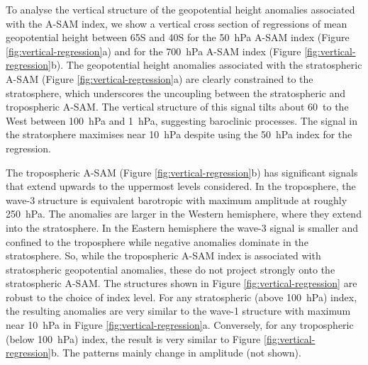 \documentclass[smallextended]{svjour3}       %
\begin{document}
To analyse the vertical structure of the geopotential height anomalies associated with the A\nobreakdash-SAM index, we show a vertical cross section of regressions of mean geopotential height between 65\degree S and 40\degree S for the 50~hPa A\nobreakdash-SAM index (Figure \ref{fig:vertical-regression}a) and for the 700~hPa A\nobreakdash-SAM index (Figure \ref{fig:vertical-regression}b).
The geopotential height anomalies associated with the stratospheric A\nobreakdash-SAM (Figure \ref{fig:vertical-regression}a) are clearly constrained to the stratosphere, which underscores the uncoupling between the stratospheric and tropospheric A\nobreakdash-SAM.
The vertical structure of this signal tilts about 60\degree~to the West between 100~hPa and 1~hPa, suggesting baroclinic processes.
The signal in the stratosphere maximises near 10~hPa despite using the 50~hPa index for the regression.

The tropospheric A\nobreakdash-SAM (Figure \ref{fig:vertical-regression}b) has significant signals that extend upwards to the uppermost levels considered.
In the troposphere, the wave-3 structure is equivalent barotropic with maximum amplitude at roughly 250~hPa.
The anomalies are larger in the Western hemisphere, where they extend into the stratosphere.
In the Eastern hemisphere the wave-3 signal is smaller and confined to the troposphere while negative anomalies dominate in the stratosphere.
So, while the tropospheric A\nobreakdash-SAM index is associated with stratospheric geopotential anomalies, these do not project strongly onto the stratospheric A\nobreakdash-SAM.
The structures shown in Figure \ref{fig:vertical-regression} are robust to the choice of index level.
For any stratospheric (above 100~hPa) index, the resulting anomalies are very similar to the wave-1 structure with maximum near 10~hPa in Figure \ref{fig:vertical-regression}a.
Conversely, for any tropospheric (below 100~hPa) index, the result is very similar to Figure \ref{fig:vertical-regression}b.
The patterns mainly change in amplitude (not shown).
\end{document}
